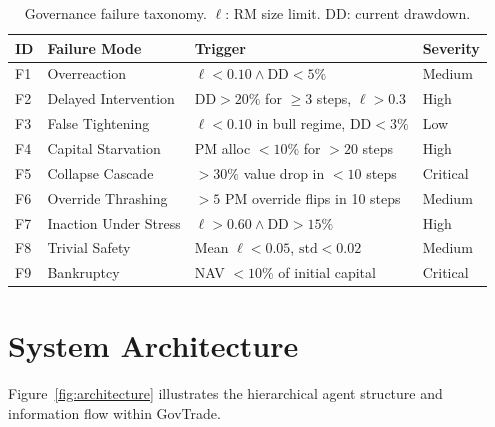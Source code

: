 \documentclass[11pt]{article}
\begin{document}
\begin{table}[h]
\centering
\small
\begin{tabular}{@{}llll@{}}
\toprule
\textbf{ID} & \textbf{Failure Mode} & \textbf{Trigger} & \textbf{Severity} \\ \midrule
F1 & Overreaction          & $\ell < 0.10 \wedge \text{DD} < 5\%$          & Medium \\
F2 & Delayed Intervention  & $\text{DD} > 20\%$ for $\geq 3$ steps, $\ell > 0.3$ & High \\
F3 & False Tightening      & $\ell < 0.10$ in bull regime, $\text{DD} < 3\%$ & Low \\
F4 & Capital Starvation    & PM alloc $< 10\%$ for $> 20$ steps            & High \\
F5 & Collapse Cascade      & $>30\%$ value drop in $<10$ steps              & Critical \\
F6 & Override Thrashing    & $>5$ PM override flips in 10 steps             & Medium \\
F7 & Inaction Under Stress & $\ell > 0.60 \wedge \text{DD} > 15\%$         & High \\
F8 & Trivial Safety        & Mean $\ell < 0.05$, $\text{std} < 0.02$       & Medium \\
F9 & Bankruptcy            & NAV $< 10\%$ of initial capital                & Critical \\
\bottomrule
\end{tabular}
\caption{Governance failure taxonomy. $\ell$: RM size limit. DD: current drawdown.}
\label{tab:failures}
\end{table}

\section{System Architecture}
\label{sec:architecture_fig}

Figure~\ref{fig:architecture} illustrates the hierarchical agent structure and information flow within GovTrade.
\end{document}
